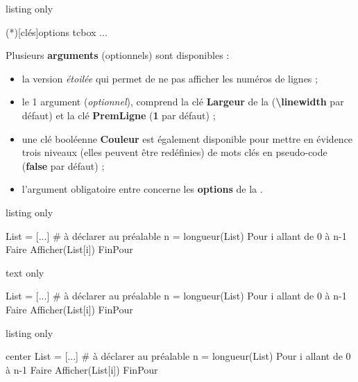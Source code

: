 \documentclass[a4paper,french,11pt]{article}
\newcommand\ctex[1]{\tcbox[vignettelatex]{#1}}
\newcommand\cmaj[1]{%
	{\tcbox[vignetteMaJ]{#1}\xspace}%
}
\newcommand\Cle[1]{{\bfseries\sffamily\textlangle \textcolor{orange!75!black}{#1}\textrangle}}
\begin{document}
\begin{PresCodeTexPL}{listing only}
\begin{PseudoCodeAlt}(*)[clés]{options tcbox}
...
\end{PseudoCodeAlt}
\end{PresCodeTexPL}

\begin{cautionblock}
Plusieurs \Cle{arguments} (optionnels) sont disponibles :

\begin{itemize}
	\item la version \textit{étoilée} qui permet de ne pas afficher les numéros de lignes ;
	\item le 1 argument (\textit{optionnel}), comprend la clé \Cle{Largeur} de la \ctex{tcbox} (\Cle{\textbackslash linewidth} par défaut) et la clé \Cle{PremLigne} (\Cle{1} par défaut) ;
	\item \cmaj{2.7.5} une clé booléenne \Cle{Couleur} est également disponible pour mettre en évidence trois niveaux (elles peuvent être redéfinies) de mots clés en pseudo-code (\Cle{false} par défaut) ;
	\item \cmaj{2.5.8} l'argument obligatoire entre \ctex{\{...\}} concerne les \Cle{options} de la \ctex{tcbox}.
\end{itemize}
\vspace*{-\baselineskip}\leavevmode
\end{cautionblock}

\begin{PresCodeTexPL}{listing only}
\begin{PseudoCode}{} %
List = [...]          # à déclarer au préalable
n = longueur(List)
Pour i allant de 0 à n-1 Faire
	Afficher(List[i])
FinPour
\end{PseudoCode}
\end{PresCodeTexPL}

\begin{PresCodeSortiePL}{text only}
\begin{PseudoCode}{}
List = [...]          # à déclarer au préalable
n = longueur(List)
Pour i allant de 0 à n-1 Faire
	Afficher(List[i])
FinPour
\end{PseudoCode}
\end{PresCodeSortiePL}

\begin{PresCodeTexPL}{listing only}
\begin{PseudoCodeAlt}[Largeur=15cm,PremLigne=7,Couleur]{center} %
List = [...]          # à déclarer au préalable
n = longueur(List)
Pour i allant de 0 à n-1 Faire
	Afficher(List[i])
FinPour
\end{PseudoCodeAlt}
\end{PresCodeTexPL}
\end{document}
